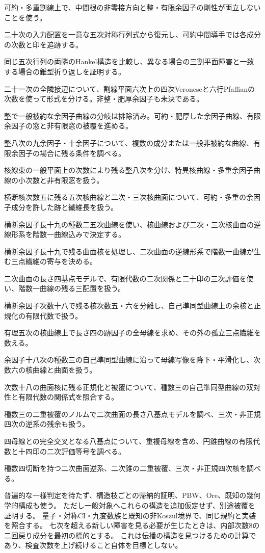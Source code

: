 \documentclass[11pt,a4paper]{ltjsarticle}
\begin{document}
可約・多重割線上で、中間根の非零接方向と整・有限余因子の剛性が両立しないことを使う。

二十次の入力配置を一意な五次対称行列式から復元し、可約中間導手では各成分の次数と印を追跡する。

同じ五次行列の両隣のHankel構造を比較し、異なる場合の三割平面障害と一致する場合の錐型折り返しを証明する。

二十一次の全隣接辺について、割線平面六次上の四次Veroneseと六行Pfaffianの次数を使って形式を分ける。非整・肥厚余因子も未決である。

整で一般被約な余因子曲線の分岐は排除済み。可約・肥厚した余因子曲線、有限余因子の窓と非有限窓の被覆を進める。

整八次の九余因子・十余因子について、複数の成分または一般非被約な曲線、有限余因子の場合に残る条件を調べる。

核線束の一般平面上の次数により残る整八次を分け、特異核曲線・多重余因子曲線の小次数と非有限窓を扱う。

横断核次数五に残る五次核曲線と二次・三次核曲面について、可約・多重の余因子成分を許した跡と繊維長を扱う。

横断余因子長十九の種数二五次曲線を使い、核曲線および二次・三次核曲面の逆線形系を階数一曲線込みで決定する。

横断余因子長十九で残る曲面核を処理し、二次曲面の逆線形系で階数一曲線が生む三点繊維の寄与を決める。

二次曲面の長さ四基点モデルで、有限代数の二次関係と二十印の三次評価を使い、階数一曲線の残る三配置を扱う。

横断余因子次数十八で残る核次数五・六を分離し、自己準同型曲線上の余核と正規化の有限代数で扱う。

有理五次の核曲線上で長さ四の跡因子の全母線を求め、その外の孤立三点繊維を数える。

余因子十八次の種数三の自己準同型曲線に沿って母線写像を降下・平滑化し、次数六の核曲線と曲面を扱う。

次数十八の曲面核に残る正規化と被覆について、種数三の自己準同型曲線の双対性と有限代数の関係式を照合する。

種数三の二重被覆のノルムで二次曲面の長さ八基点モデルを調べ、三次・非正規四次の逆系の残余も扱う。

四母線との完全交叉となる八基点について、重複母線を含め、円錐曲線の有限代数と十四印の二次評価等号を調べる。

種数四切断を持つ二次曲面逆系、二次錐の二重被覆、三次・非正規四次核を調べる。

普遍的な一様判定を待たず、構造枝ごとの帰納的証明、PBW、Ore、既知の幾何学的構成も使う。
ただし一般対象へこれらの構造を追加仮定せず、別途被覆を証明する。
量子・対称CI・九変数族と既知の非Koszul境界で、同じ規約と実装を照合する。
七次を超える新しい障害を見る必要が生じたときは、内部次数8の二回戻り成分を最初の標的とする。
これは伝播の構造を見つけるための計算であり、検査次数を上げ続けること自体を目標としない。
\end{document}
